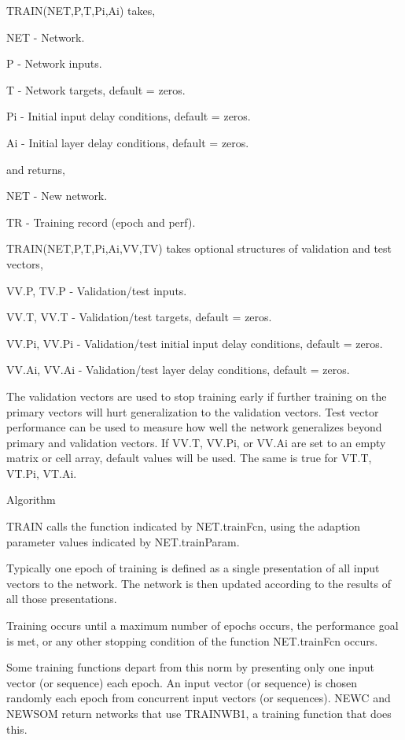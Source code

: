      TRAIN(NET,P,T,Pi,Ai) takes,

       NET - Network.

       P   - Network inputs.

       T   - Network targets, default = zeros.

       Pi  - Initial input delay conditions, default = zeros.

       Ai  - Initial layer delay conditions, default = zeros.

     and returns,

       NET - New network.

       TR  - Training record (epoch and perf).

     TRAIN(NET,P,T,Pi,Ai,VV,TV) takes optional structures of validation
     and test vectors,

       VV.P,  TV.P  - Validation/test inputs.

       VV.T,  VV.T  - Validation/test targets, default = zeros.

       VV.Pi, VV.Pi - Validation/test initial input delay conditions, default = zeros.

       VV.Ai, VV.Ai - Validation/test layer delay conditions, default = zeros.

     The validation vectors are used to stop training early if further
     training on the primary vectors will hurt generalization to the
     validation vectors.  Test vector performance can be used to measure
     how well the network generalizes beyond primary and validation vectors.
     If VV.T, VV.Pi, or VV.Ai are set to an empty matrix or cell array,
     default values will be used. The same is true for VT.T, VT.Pi, VT.Ai.

   Algorithm

     TRAIN calls the function indicated by NET.trainFcn, using the
     adaption parameter values indicated by NET.trainParam.

     Typically one epoch of training is defined as a single presentation
     of all input vectors to the network.  The network is then updated
     according to the results of all those presentations.

     Training occurs until a maximum number of epochs occurs, the
     performance goal is met, or any other stopping condition of the
     function NET.trainFcn occurs.

     Some training functions depart from this norm by presenting only
     one input vector (or sequence) each epoch. An input vector (or sequence)
     is chosen randomly each epoch from concurrent input vectors (or sequences).
     NEWC and NEWSOM return networks that use TRAINWB1, a training function
     that does this.

